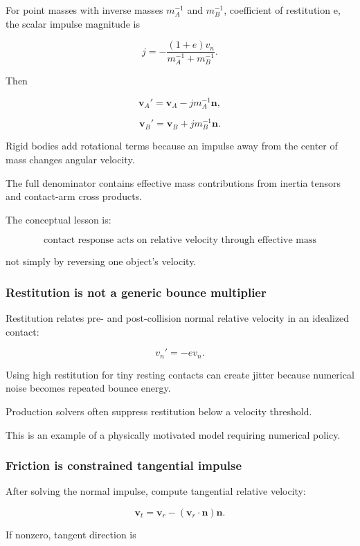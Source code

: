 For point masses with inverse masses \(m_A^{-1}\) and \(m_B^{-1}\), coefficient of restitution e, the scalar impulse magnitude is

\[
j
=
-\frac{(1+e)v_n}
{m_A^{-1}+m_B^{-1}}.
\]

Then

\[
\mathbf v_A'
=
\mathbf v_A
-
j m_A^{-1}\mathbf n,
\]

\[
\mathbf v_B'
=
\mathbf v_B
+
j m_B^{-1}\mathbf n.
\]

Rigid bodies add rotational terms because an impulse away from the center of mass changes angular velocity.

The full denominator contains effective mass contributions from inertia tensors and contact-arm cross products.

The conceptual lesson is:

\[
\boxed{
\text{contact response acts on relative velocity through effective mass}
}
\]

not simply by reversing one object's velocity.

\subsubsection{Restitution is not a generic bounce multiplier}\label{03-visual-computing-i-ch001-restitution-is-not-a-generic-bounce-multiplier}

Restitution relates pre- and post-collision normal relative velocity in an idealized contact:

\[
v_n'
=
-e v_n.
\]

Using high restitution for tiny resting contacts can create jitter because numerical noise becomes repeated bounce energy.

Production solvers often suppress restitution below a velocity threshold.

This is an example of a physically motivated model requiring numerical policy.

\subsubsection{Friction is constrained tangential impulse}\label{03-visual-computing-i-ch001-friction-is-constrained-tangential-impulse}

After solving the normal impulse, compute tangential relative velocity:

\[
\mathbf v_t
=
\mathbf v_r
-
(\mathbf v_r\cdot\mathbf n)\mathbf n.
\]

If nonzero, tangent direction is

